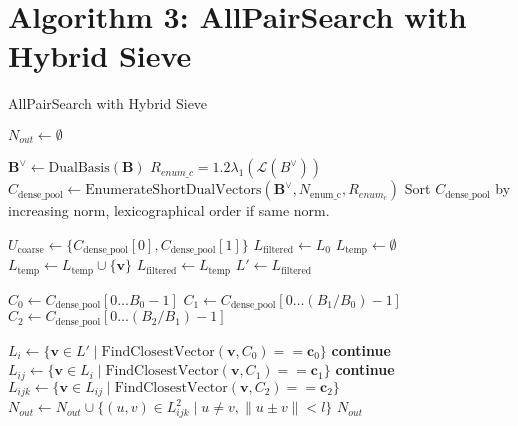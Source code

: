 \documentclass{article}
\begin{document}
\section{Algorithm 3: AllPairSearch with Hybrid Sieve}

\begin{algorithm}[H]
\caption{AllPairSearch with Hybrid Sieve} \label{alg:hybrid_sieve}
\begin{algorithmic}[1]
\State $N_{out} \gets \emptyset$
\Statex

\State $\mathbf{B}^{\vee} \gets \text{DualBasis}(\mathbf{B})$
\State $R_{enum\_c}=1.2\lambda _1(\mathcal{L}(B^\vee)) $
\State $C_{\text{dense\_pool}} \gets \text{EnumerateShortDualVectors}(\mathbf{B}^{\vee}, N_{\text{enum\_c}}, R_{enum_c})$ 
\State Sort $C_{\text{dense\_pool}}$ by increasing norm, lexicographical order if same norm.
\Statex

\State $U_{\text{coarse}} \gets \{ C_{\text{dense\_pool}}[0], C_{\text{dense\_pool}}[1] \}$ 
\State $L_{\text{filtered}} \gets L_0$
    \State $L_{\text{temp}} \gets \emptyset$
            \State $L_{\text{temp}} \gets L_{\text{temp}} \cup \{\mathbf{v}\}$
        \EndIf
    \EndFor
    \State $L_{\text{filtered}} \gets L_{\text{temp}}$ 
\EndFor
\State $L' \gets L_{\text{filtered}}$ 
\Statex

\State $C_0 \gets C_{\text{dense\_pool}}[0 \ldots B_0-1]$
\State $C_1 \gets C_{\text{dense\_pool}}[0 \ldots (B_1/B_0)-1]$
\State $C_2 \gets C_{\text{dense\_pool}}[0 \ldots (B_2/B_1)-1]$
\Statex

    \State $L_i \gets \{\mathbf{v} \in L' \mid \text{FindClosestVector}(\mathbf{v}, C_0) == \mathbf{c}_0\}$
     \textbf{continue} \EndIf
        \State $L_{ij} \gets \{\mathbf{v} \in L_i \mid \text{FindClosestVector}(\mathbf{v}, C_1) == \mathbf{c}_1\}$
         \textbf{continue} \EndIf
            \State $L_{ijk} \gets \{\mathbf{v} \in L_{ij} \mid \text{FindClosestVector}(\mathbf{v}, C_2) == \mathbf{c}_2\}$
                \State $N_{out} \gets N_{out} \cup \{ (u, v) \in L_{ijk}^2 \mid u \neq v, \|u \pm v\| < l \}$
            \EndIf
        \EndFor
    \EndFor
\EndFor
\State \Return $N_{out}$
\end{algorithmic}
\end{algorithm}
\end{document}
